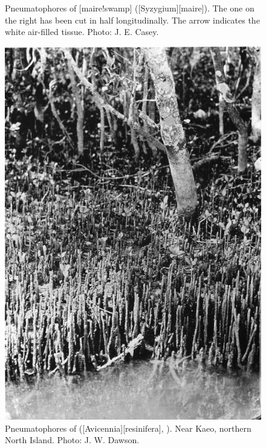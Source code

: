 \begin{figure}[t]
\begin{minipage}[t]{\textwidth}
\begin{minipage}[t]{(\textwidth-\fgap-\fgap) * \real{0.280}}
			\caption[Pneumatophores of swamp maire]{Pneumatophores of [maire!swamp] ([Syzygium][maire]).
			The one on the right has been cut in half longitudinally.
			The arrow indicates the white air-filled tissue.
			Photo:  J. E. Casey.}%
			\label{fig:12swampmaire}
		\end{minipage}\hspace{\fgap}%
		\begin{minipage}[t]{(\textwidth-\fgap-\fgap) * \real{0.366}}
			\centering
			\includegraphics[width=\textwidth]{graphics/figure13mangrove.jpg}
			\caption[Pneumatophores of mangrove]{Pneumatophores of  ([Avicennia][resinifera], ).
			Near Kaeo, northern North Island.
			Photo:  J. W. Dawson.}%
			\label{fig:13mangrove}
		\end{minipage}\hspace{\fgap}%

\end{minipage}
\end{figure}
